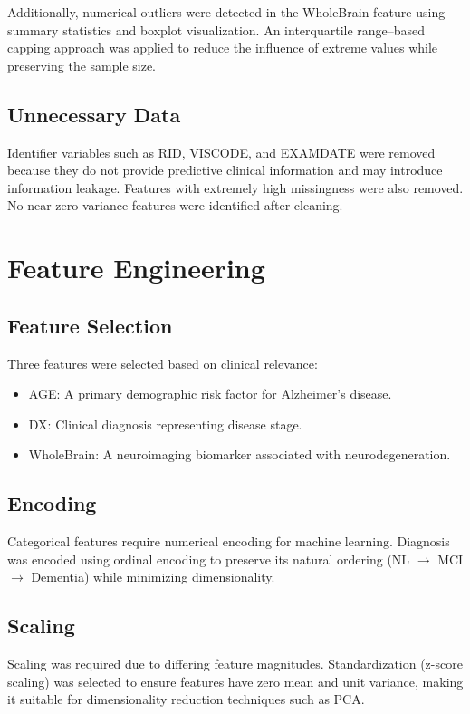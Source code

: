 \documentclass[11pt]{article}
\begin{document}
Additionally, numerical outliers were detected in the WholeBrain feature using summary statistics and boxplot visualization. An interquartile range–based capping approach was applied to reduce the influence of extreme values while preserving the sample size.

\subsection{Unnecessary Data}
Identifier variables such as RID, VISCODE, and EXAMDATE were removed because they do not provide predictive clinical information and may introduce information leakage. Features with extremely high missingness were also removed. No near-zero variance features were identified after cleaning.

\section{Feature Engineering}

\subsection{Feature Selection}
Three features were selected based on clinical relevance:
\begin{itemize}
\item AGE: A primary demographic risk factor for Alzheimer’s disease.
\item DX: Clinical diagnosis representing disease stage.
\item WholeBrain: A neuroimaging biomarker associated with neurodegeneration.
\end{itemize}

\subsection{Encoding}
Categorical features require numerical encoding for machine learning. Diagnosis was encoded using ordinal encoding to preserve its natural ordering (NL $\rightarrow$ MCI $\rightarrow$ Dementia) while minimizing dimensionality.

\subsection{Scaling}
Scaling was required due to differing feature magnitudes. Standardization (z-score scaling) was selected to ensure features have zero mean and unit variance, making it suitable for dimensionality reduction techniques such as PCA.
\end{document}
